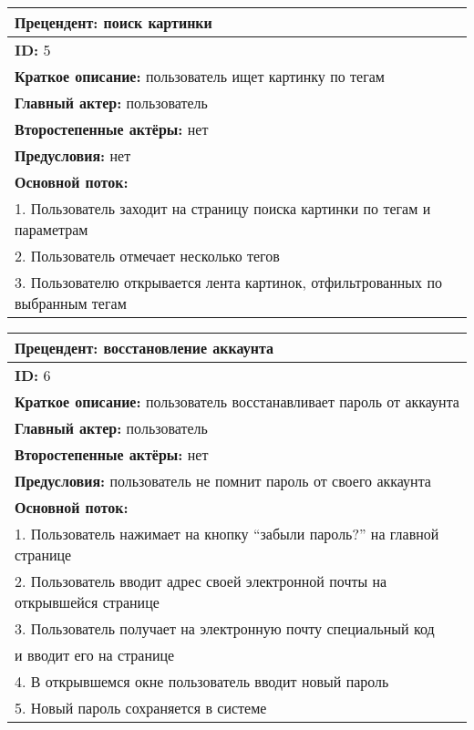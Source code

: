 \documentclass[12pt]{article}
\begin{document}
\begin{table}[H]
\begin{tabular}{|l|}
    \hline
    \textbf{Прецендент:} поиск картинки \\
    \hline
    \textbf{ID:} 5 \\
    \hline
    \textbf{Краткое описание:} пользователь ищет картинку по тегам \\
    \hline
    \textbf{Главный актер:} пользователь  \\
    \hline
    \textbf{Второстепенные актёры:} нет \\
    \hline
    \textbf{Предусловия:} нет \\
    \hline 
    \textbf{Основной поток:} \\
    1. Пользователь заходит на страницу поиска картинки по тегам и параметрам \\
    2. Пользователь отмечает несколько тегов \\
    3. Пользователю открывается лента картинок, отфильтрованных по выбранным тегам \\ 
    \hline
\end{tabular}
\end{table}

\begin{table}[H]
\begin{tabular}{|l|}
    \hline
    \textbf{Прецендент:} восстановление аккаунта \\
    \hline
    \textbf{ID:} 6 \\
    \hline
    \textbf{Краткое описание:} пользователь восстанавливает пароль от аккаунта \\
    \hline
    \textbf{Главный актер:} пользователь \\
    \hline
    \textbf{Второстепенные актёры:} нет \\
    \hline
    \textbf{Предусловия:} пользователь не помнит пароль от своего аккаунта \\
    \hline 
    \textbf{Основной поток:} \\
    1. Пользователь нажимает на кнопку \enquote{забыли пароль?} на главной странице \\ 
    2. Пользователь вводит адрес своей электронной почты на открывшейся странице \\
    3. Пользователь получает на электронную почту специальный код \\
    и вводит его на странице \\
    4. В открывшемся окне пользователь вводит новый пароль \\
    5. Новый пароль сохраняется в системе \\
    \hline
\end{tabular}
\end{table}
\end{document}
